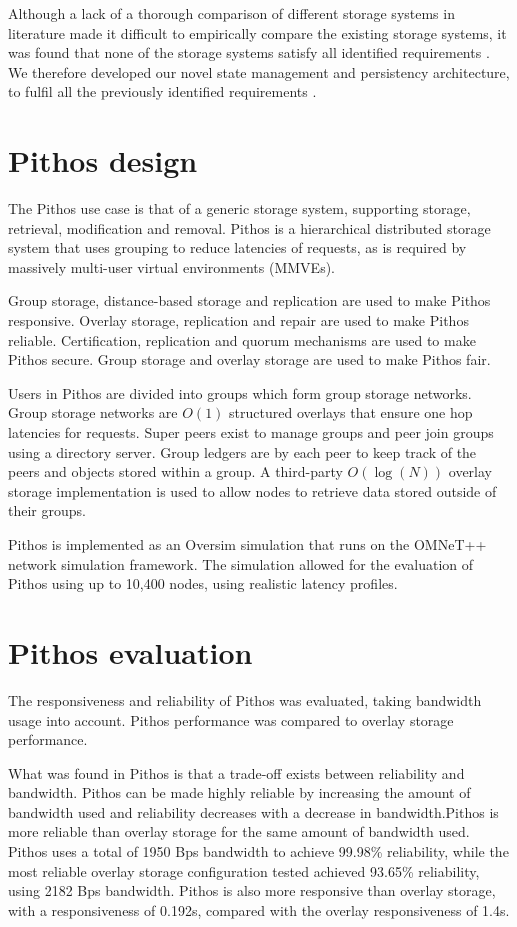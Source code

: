Although a lack of a thorough comparison of different storage systems in literature made it difficult to empirically compare the existing storage systems, it was found that none of the storage systems satisfy all identified requirements \cite{gilmore_p2p_mmog_state_persistency}. We therefore developed our novel state management and persistency architecture, to fulfil all the previously identified requirements \cite{Pithos_mmve_2011}.

\section{Pithos design}

The Pithos use case is that of a generic storage system, supporting storage, retrieval, modification and removal. Pithos is a hierarchical distributed storage system that uses grouping to reduce latencies of requests, as is required by massively multi-user virtual environments (MMVEs).

Group storage, distance-based storage and replication are used to make Pithos responsive. Overlay storage, replication and repair are used to make Pithos reliable. Certification, replication and quorum mechanisms are used to make Pithos secure. Group storage and overlay storage are used to make Pithos fair.

Users in Pithos are divided into groups which form group storage networks. Group storage networks are $O(1)$ structured overlays that ensure one hop latencies for requests. Super peers exist to manage groups and peer join groups using a directory server. Group ledgers are by each peer to keep track of the peers and objects stored within a group. A third-party $O(\log (N))$ overlay storage implementation is used to allow nodes to retrieve data stored outside of their groups.

Pithos is implemented as an Oversim simulation that runs on the OMNeT++ network simulation framework. The simulation allowed for the evaluation of Pithos using up to 10,400 nodes, using realistic latency profiles.

\section{Pithos evaluation}

The responsiveness and reliability of Pithos was evaluated, taking bandwidth usage into account. Pithos performance was compared to overlay storage performance.

What was found in Pithos is that a trade-off exists between reliability and bandwidth. Pithos can be made highly reliable by increasing the amount of bandwidth used and reliability decreases with a decrease in bandwidth.Pithos is more reliable than overlay storage for the same amount of bandwidth used. Pithos uses a total of 1950 Bps bandwidth to achieve 99.98\% reliability, while the most reliable overlay storage configuration tested achieved 93.65\% reliability, using 2182 Bps bandwidth. Pithos is also more responsive than overlay storage, with a responsiveness of 0.192s, compared with the overlay responsiveness of 1.4s.

